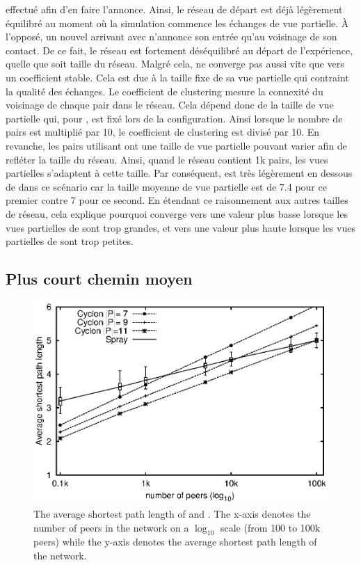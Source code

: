 \begin{asparadesc}
  effectué afin d'en faire l'annonce. Ainsi, le réseau de départ est déjà
  légèrement équilibré au moment où la simulation commence les échanges de vue
  partielle. À l'opposé, un nouvel arrivant avec \SPRAY n'annonce son entrée
  qu'au voisinage de son contact. De ce fait, le réseau est fortement
  déséquilibré au départ de l'expérience, quelle que soit taille du
  réseau. Malgré cela, \CYCLON ne converge pas aussi vite que \SPRAY vers un
  coefficient stable. Cela est due à la taille fixe de sa vue partielle qui
  contraint la qualité des échanges. Le coefficient de clustering mesure la
  connexité du voisinage de chaque pair dans le réseau. Cela dépend donc de la
  taille de vue partielle qui, pour \CYCLON, est fixé lors de la configuration.
  Ainsi lorsque le nombre de pairs est multiplié par 10, le coefficient de
  clustering est divisé par 10. En revanche, les pairs utilisant \SPRAY ont une
  taille de vue partielle pouvant varier afin de refléter la taille du réseau.
  Ainsi, quand le réseau contient 1k pairs, les vues partielles s'adaptent à
  cette taille. Par conséquent, \SPRAY est très légèrement en dessous de \CYCLON
  dans ce scénario car la taille moyenne de vue partielle est de 7.4 pour ce
  premier contre 7 pour ce second. En étendant ce raisonnement aux autres
  tailles de réseau, cela explique pourquoi \SPRAY converge vers une valeur plus
  basse lorsque les vues partielles de \CYCLON sont trop grandes, et vers une
  valeur plus haute lorsque les vues partielles de \CYCLON sont trop petites.
\end{asparadesc}

\subsection{Plus court chemin moyen}

\begin{figure}
  \centering
  \includegraphics[width=.8\textwidth]{img/spray/avgpath.eps}
  \caption{\label{fig:spray:avgpath}The average shortest path length of \SPRAY
    and \CYCLON. The x-axis denotes the number of peers in the network on a
    $\log_{10}$ scale (from 100 to 100k peers) while the y-axis denotes the
    average shortest path length of the network.}
\end{figure}

